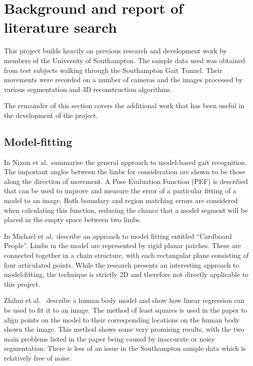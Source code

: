 \section{Background and report of literature search}

This project builds heavily on previous research and development work by members of the University of Southampton.
The sample data used was obtained from test subjects walking through the Southampton Gait Tunnel.
Their movements were recorded on a number of cameras and the images processed by various segmentation and 3D reconstruction algorithms.

The remainder of this section covers the additional work that has been useful in the development of the project.

\subsection{Model-fitting}

In \cite{GaitBook} Nixon et al.\ summarise the general approach to model-based gait recognition.
The important angles between the limbs for consideration are shown to be those along the direction of movement.
A Pose Evaluation Function (PEF) is described that can be used to improve and measure the error of a particular fitting of a model to an image.
Both boundary and region matching errors are considered when calculating this function, reducing the chance that a model segment will be placed in the empty space between two limbs.

\bigskip
\noindent In \cite{cardboardpeople} Michael et al.\ describe an approach to model fitting entitled ``Cardboard People''.
Limbs in the model are represented by rigid planar patches.
These are connected together in a chain structure, with each rectangular plane consisting of four articulated points.
While the research presents an interesting approach to model-fitting, the technique is strictly 2D and therefore not directly applicable to this project.

\bigskip
\noindent Zhihui et al.\ \cite{LinearModelFitting} describe a human body model and show how linear regression can be used to fit it to an image.
The method of least squares is used in the paper to align points on the model to their corresponding locations on the human body shown the image.
This method shows some very promising results, with the two main problems listed in the paper being caused by inaccurate or noisy segmentation.
There is less of an issue in the Southampton sample data which is relatively free of noise.

